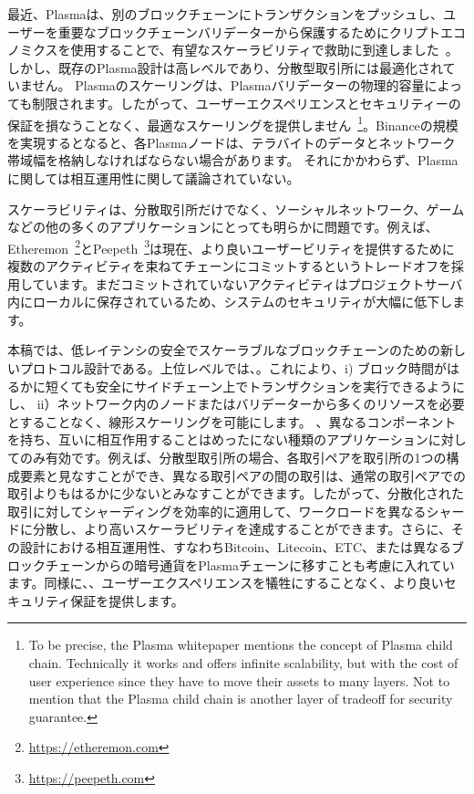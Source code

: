最近、Plasmaは、別のブロックチェーンにトランザクションをプッシュし、ユーザーを重要なブロックチェーンバリデーターから保護するためにクリプトエコノミクスを使用することで、有望なスケーラビリティで救助に到達しました~\cite{plasma}。しかし、既存のPlasma設計は高レベルであり、分散型取引所には最適化されていません。 Plasmaのスケーリングは、Plasmaバリデーターの物理的容量によっても制限されます。したがって、ユーザーエクスペリエンスとセキュリティーの保証を損なうことなく、最適なスケーリングを提供しません~\footnote{To be precise, the Plasma whitepaper mentions the concept of Plasma child chain. Technically it works and offers infinite scalability, but with the cost of user experience since they have to move their assets to many layers. Not to mention that the Plasma child chain is another layer of tradeoff for security guarantee.}。Binanceの規模を実現するとなると、各Plasmaノードは、テラバイトのデータとネットワーク帯域幅を格納しなければならない場合があります。 それにかかわらず、Plasmaに関しては相互運用性に関して議論されていない。

スケーラビリティは、分散取引所だけでなく、ソーシャルネットワーク、ゲームなどの他の多くのアプリケーションにとっても明らかに問題です。例えば、Etheremon~\footnote{\url{https://etheremon.com}}とPeepeth~\footnote{\url{https://peepeth.com}}は現在、より良いユーザービリティを提供するために複数のアクティビティを束ねてチェーンにコミットするというトレードオフを採用しています。まだコミットされていないアクティビティはプロジェクトサーバ内にローカルに保存されているため、システムのセキュリティが大幅に低下します。

本稿では、低レイテンシの安全でスケーラブルなブロックチェーンのための新しいプロトコル設計である。上位レベルでは、。これにより、i) ブロック時間がはるかに短くても安全にサイドチェーン上でトランザクションを実行できるようにし、 ii）ネットワーク内のノードまたはバリデーターから多くのリソースを必要とすることなく、線形スケーリングを可能にします。 、異なるコンポーネントを持ち、互いに相互作用することはめったにない種類のアプリケーションに対してのみ有効です。例えば、分散型取引所の場合、各取引ペアを取引所の1つの構成要素と見なすことができ、異なる取引ペアの間の取引は、通常の取引ペアでの取引よりもはるかに少ないとみなすことができます。したがって、分散化された取引に対してシャーディングを効率的に適用して、ワークロードを異なるシャードに分散し、より高いスケーラビリティを達成することができます。さらに、その設計における相互運用性、すなわちBitcoin、Litecoin、ETC、または異なるブロックチェーンからの暗号通貨をPlasmaチェーンに移すことも考慮に入れています。同様に、、ユーザーエクスペリエンスを犠牲にすることなく、より良いセキュリティ保証を提供します。

